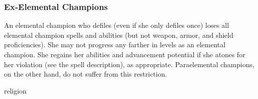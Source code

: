 {\subsubsection{Ex-Elemental Champions}
An elemental champion who defiles (even if she only defiles once) loses all elemental champion spells and abilities (but not weapon, armor, and shield proficiencies). She may not progress any farther in levels as an elemental champion. She regains her abilities and advancement potential if she atones for her violation (see the  spell description), as appropriate. Paraelemental champions, on the other hand, do not suffer from this restriction.
}
{}
{religion}
{}
{}
{}